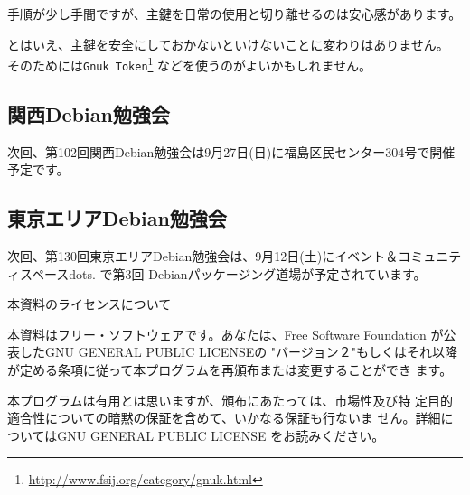 \documentclass[mingoth,a4paper]{jsarticle}
\begin{document}
手順が少し手間ですが、主鍵を日常の使用と切り離せるのは安心感があります。

とはいえ、主鍵を安全にしておかないといけないことに変わりはありません。
そのためには{\tt Gnuk Token}\footnote{\url{http://www.fsij.org/category/gnuk.html}}
などを使うのがよいかもしれません。



\subsection{関西Debian勉強会}
次回、第102回関西Debian勉強会は9月27日(日)に福島区民センター304号で開催予定です。

\subsection{東京エリアDebian勉強会}
次回、第130回東京エリアDebian勉強会は、9月12日(土)にイベント＆コミュニティスペースdots.
で第3回 Debianパッケージング道場が予定されています。


%

\pagebreak

\begin{center}
本資料のライセンスについて
\end{center}

本資料はフリー・ソフトウェアです。あなたは、Free Software
Foundation が公表したGNU GENERAL PUBLIC LICENSEの "バージョン２"もしくはそれ以降
が定める条項に従って本プログラムを再頒布または変更することができ
ます。

本プログラムは有用とは思いますが、頒布にあたっては、市場性及び特
定目的適合性についての暗黙の保証を含めて、いかなる保証も行ないま
せん。詳細についてはGNU GENERAL PUBLIC LICENSE をお読みください。
\end{document}
